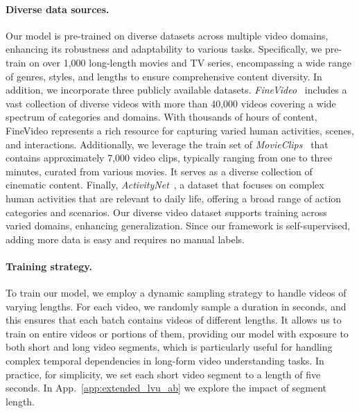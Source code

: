 \paragraph{Diverse data sources.} Our model is pre-trained on diverse datasets across multiple video domains, enhancing its robustness and adaptability to various tasks. 
Specifically, we pre-train on over 1,000 long-length movies and TV series, encompassing a wide range of genres, styles, and lengths to ensure comprehensive content diversity.
In addition, we incorporate three publicly available datasets. 
\textit{FineVideo}~\cite{Farré2024FineVideo} includes a vast collection of diverse videos with more than 40,000 videos covering a wide spectrum of categories and domains. With thousands of hours of content, FineVideo represents a rich resource for capturing varied human activities, scenes, and interactions. Additionally, we leverage the train set of \textit{MovieClips}~\cite{wu2021towards} that contains approximately 7,000 video clips, typically ranging from one to three minutes, curated from various movies. It serves as a diverse collection of cinematic content. Finally, \textit{ActivityNet}~\cite{caba2015activitynet}, a dataset that focuses on complex human activities that are relevant to daily life, offering a broad range of action categories and scenarios. Our diverse video dataset supports training across varied domains, enhancing generalization. Since our framework is self-supervised, adding more data is easy and requires no manual labels.


\vspace{-4mm}
\paragraph{Training strategy.} To train our model, we employ a dynamic sampling strategy to handle videos of varying lengths. For each video, we randomly sample a duration in seconds, and this ensures that each batch contains videos of different lengths. It allows us to train on entire videos or portions of them, providing our model with exposure to both short and long video segments, which is particularly useful for handling complex temporal dependencies in long-form video understanding tasks. In practice, for simplicity, we set each short video segment to a length of five seconds. In App.~\ref{app:extended_lvu_ab} we explore the impact of segment length.

\vspace{-4mm}
